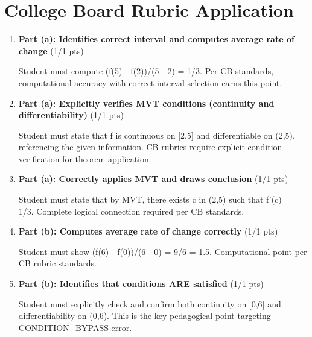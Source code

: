 \documentclass[11pt,letterpaper]{article}
\begin{document}

\section*{\textcolor{alphablue}{College Board Rubric Application}}

\begin{tcolorbox}[colback=green!5!white, colframe=green!70, title=\textbf{Total Score: 9 / 9 points}, arc=2mm]
  \begin{enumerate}[leftmargin=*]
    
    \item \textbf{Part (a): Identifies correct interval and computes average rate of change} (1/1 pts)

    Student must compute (f(5) - f(2))/(5 - 2) = 1/3. Per CB standards, computational accuracy with correct interval selection earns this point.
    

    \item \textbf{Part (a): Explicitly verifies MVT conditions (continuity and differentiability)} (1/1 pts)

    Student must state that f is continuous on [2,5] and differentiable on (2,5), referencing the given information. CB rubrics require explicit condition verification for theorem application.
    

    \item \textbf{Part (a): Correctly applies MVT and draws conclusion} (1/1 pts)

    Student must state that by MVT, there exists c in (2,5) such that f'(c) = 1/3. Complete logical connection required per CB standards.
    

    \item \textbf{Part (b): Computes average rate of change correctly} (1/1 pts)

    Student must show (f(6) - f(0))/(6 - 0) = 9/6 = 1.5. Computational point per CB rubric standards.
    

    \item \textbf{Part (b): Identifies that conditions ARE satisfied} (1/1 pts)

    Student must explicitly check and confirm both continuity on [0,6] and differentiability on (0,6). This is the key pedagogical point targeting CONDITION_BYPASS error.
    


\end{enumerate}
\end{tcolorbox}
\end{document}
